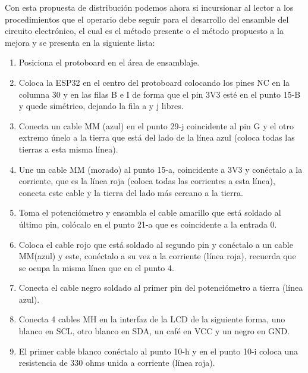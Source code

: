     Con esta propuesta de distribución podemos ahora si incursionar al lector a los procedimientos que el operario debe seguir para el desarrollo del ensamble del circuito electrónico, el cual es el método presente o el método propuesto a la mejora y se presenta en la siguiente lista:
    \begin{enumerate}
    
        \item Posiciona el protoboard en el área de ensamblaje.
    
        \item Coloca la ESP32 en el centro del protoboard colocando los pines NC en la columna 30 y en las filas B e I de forma que el pin 3V3 esté en el punto 15-B y quede simétrico, dejando la fila a y j libres. 
    
        \item Conecta un cable MM (azul) en el punto 29-j coincidente al pin G y el otro extremo únelo a la tierra que está del lado de la línea azul (coloca todas las tierras a esta misma línea).
    
        \item Une un cable MM (morado) al punto 15-a, coincidente a 3V3 y conéctalo a la corriente, que es la línea roja (coloca todas las corrientes a esta línea), conecta este cable y la tierra del lado más cercano a la tierra. 
    
        \item Toma el potenciómetro y ensambla el cable amarillo que está soldado al último pin, colócalo en el punto 21-a que es coincidente a la entrada 0.
    
        \item Coloca el cable rojo que está soldado al segundo pin y conéctalo a un cable MM(azul) y este, conéctalo a su vez a la corriente (línea roja), recuerda que se ocupa la misma línea que en el punto 4. 
    
        \item Conecta el cable negro soldado al primer pin del potenciómetro a tierra (línea azul). 
    
        \item Conecta 4 cables MH en la interfaz de la LCD de la siguiente forma, uno blanco en SCL, otro blanco en SDA, un café en VCC y un negro en GND. 
    
        \item El primer cable blanco conéctalo al punto 10-h y en el punto 10-i coloca una resistencia de 330 ohms unida a corriente (línea roja).
    

\end{enumerate}
